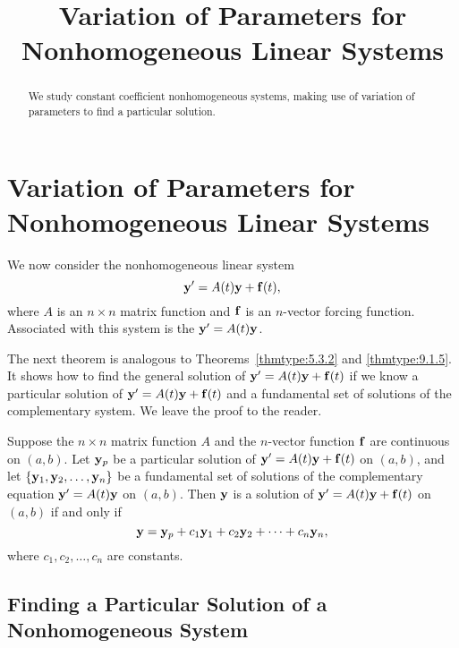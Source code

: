 \documentclass{ximera}
\title{Variation of Parameters for Nonhomogeneous Linear Systems}%
\begin{document}
\begin{abstract}
We study constant coefficient nonhomogeneous systems, making use of variation of parameters to find a particular solution.
\end{abstract}

\maketitle

\section*{Variation of Parameters for Nonhomogeneous Linear Systems}

We now consider the nonhomogeneous linear system
$$
{\bf y}'= A(t){\bf y}+{\bf f}(t),
$$
where $A$ is an $n\times n$ matrix function and ${\bf f}$ is an
$n$-vector forcing function. Associated with this system is the  ${\bf y}'=A(t){\bf y}$.

The next theorem is analogous to
Theorems~\ref{thmtype:5.3.2} and
\ref{thmtype:9.1.5}. It shows how to find the general solution
of
${\bf y}'=A(t){\bf y}+{\bf f}(t)$ if we know a particular solution of ${\bf
y}'=A(t){\bf y}+{\bf f}(t)$ and a fundamental set of solutions of the
complementary system. We leave the proof to the reader.

\begin{theorem}\label{thmtype:10.7.1}
Suppose the $n\times n$ matrix function $A$ and the $n$-vector
function ${\bf f}$ are continuous on $(a,b)$. Let ${\bf y}_p$ be a
particular solution of ${\bf y}'=A(t){\bf y}+{\bf f}(t)$ on $(a,b)$,
and let
$\{{\bf y}_1,{\bf y}_2,\dots,{\bf y}_n\}$ be a fundamental set of
solutions of the complementary equation ${\bf y}'=A(t){\bf y}$ on
$(a,b)$. Then ${\bf y}$ is a solution of ${\bf y}'=A(t){\bf y}+{\bf
f}(t)$ on $(a,b)$ if and only if
$$
{\bf y}={\bf y}_p+c_1{\bf y}_1+c_2{\bf y}_2+\cdots+c_n{\bf y}_n,
$$
where $c_1, c_2, \dots, c_n$  are constants.
\end{theorem}

\subsection*{Finding a Particular Solution of a Nonhomogeneous System}
\end{document}
